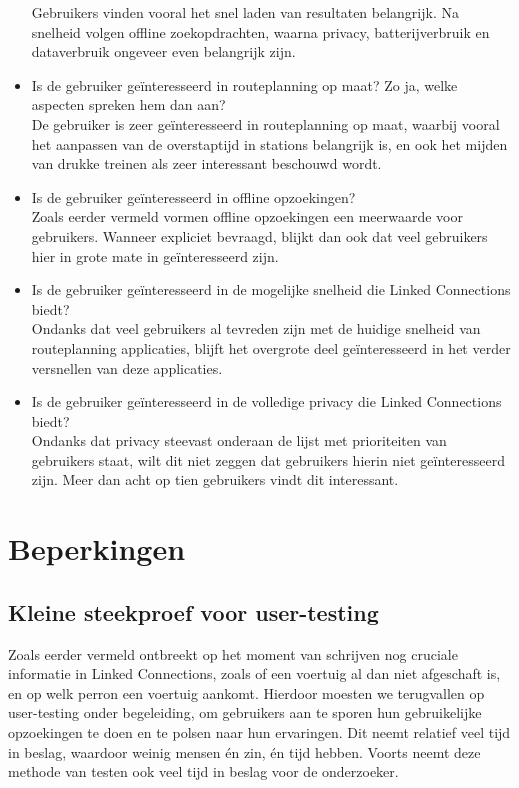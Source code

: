 \begin{itemize}
	Gebruikers vinden vooral het snel laden van resultaten belangrijk. Na snelheid volgen offline zoekopdrachten, waarna privacy, batterijverbruik en dataverbruik ongeveer even belangrijk zijn.
	\item Is de gebruiker geïnteresseerd in routeplanning op maat? Zo ja, welke aspecten spreken hem dan aan?\\
	De gebruiker is zeer geïnteresseerd in routeplanning op maat, waarbij vooral het aanpassen van de overstaptijd in stations belangrijk is, en ook het mijden van drukke treinen als zeer interessant beschouwd wordt.
	\item Is de gebruiker geïnteresseerd in offline opzoekingen?\\
	Zoals eerder vermeld vormen offline opzoekingen een meerwaarde voor gebruikers. Wanneer expliciet bevraagd, blijkt dan ook dat veel gebruikers hier in grote mate in geïnteresseerd zijn.
	\item Is de gebruiker geïnteresseerd in de mogelijke snelheid die Linked Connections biedt?\\
	Ondanks dat veel gebruikers al tevreden zijn met de huidige snelheid van routeplanning applicaties, blijft het overgrote deel geïnteresseerd in het verder versnellen van deze applicaties.
	\item Is de gebruiker geïnteresseerd in de volledige privacy die Linked Connections biedt?\\
	Ondanks dat privacy steevast onderaan de lijst met prioriteiten van gebruikers staat, wilt dit niet zeggen dat gebruikers hierin niet geïnteresseerd zijn. Meer dan acht op tien gebruikers vindt dit interessant.
\end{itemize}

\section{Beperkingen}
\label{sec:beperkingen}
\subsection{Kleine steekproef voor user-testing}
Zoals eerder vermeld ontbreekt op het moment van schrijven nog cruciale informatie in Linked Connections, zoals of een voertuig al dan niet afgeschaft is, en op welk perron een voertuig aankomt. Hierdoor moesten we terugvallen op user-testing onder begeleiding, om gebruikers aan te sporen hun gebruikelijke opzoekingen te doen en te polsen naar hun ervaringen. Dit neemt relatief veel tijd in beslag, waardoor weinig mensen én zin, én tijd hebben. Voorts neemt deze methode van testen ook veel tijd in beslag voor de onderzoeker. 

